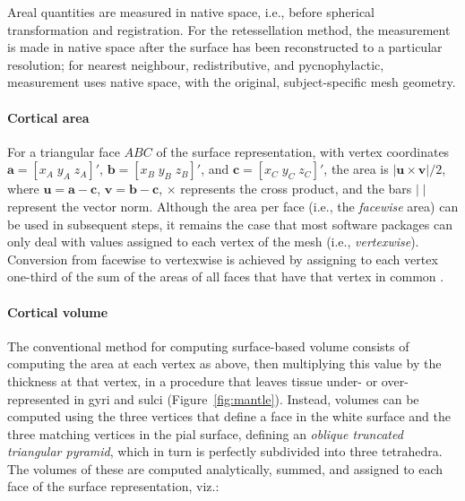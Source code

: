 Areal quantities are measured in native space, i.e., before spherical transformation and registration. For the retessellation method, the measurement is made in native space after the surface has been reconstructed to a particular resolution; for nearest neighbour, redistributive, and pycnophylactic, measurement uses native space, with the original, subject-specific mesh geometry. 

\paragraph{Cortical area}

For a triangular face $ABC$ of the surface representation, with vertex coordinates $\mathbf{a}=[x_A \; y_A \; z_A]'$, $\mathbf{b}=[x_B \; y_B \; z_B]'$, and $\mathbf{c}=[x_C \; y_C \; z_C]'$, the area is $|\mathbf{u} \times \mathbf{v}|/2$, where $\mathbf{u} = \mathbf{a}-\mathbf{c}$, $\mathbf{v} = \mathbf{b}-\mathbf{c}$, $\times$ represents the cross product, and the bars $|\;|$ represent the vector norm. Although the area per face (i.e., the \emph{facewise} area) can be used in subsequent steps, it remains the case that most software packages can only deal with values assigned to each vertex of the mesh (i.e., \emph{vertexwise}). Conversion from facewise to vertexwise is achieved by assigning to each vertex one-third of the sum of the areas of all faces that have that vertex in common \citep{Winkler2012}.

\paragraph{Cortical volume}

The conventional method for computing surface-based volume consists of computing the area at each vertex as above, then multiplying this value by the thickness at that vertex, in a procedure that leaves tissue under- or over-represented in gyri and sulci (Figure~\ref{fig:mantle}). Instead, volumes can be computed using the three vertices that define a face in the white surface and the three matching vertices in the pial surface, defining an \emph{oblique truncated triangular pyramid}, which in turn is perfectly subdivided into three tetrahedra. The volumes of these are computed analytically, summed, and assigned to each face of the surface representation, viz.:


